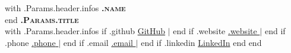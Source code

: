 \documentclass[letterpaper,11pt]{article}
\begin{document}


\begin{center}
  {{ with .Params.header.infos }}
    \textbf{\Huge \scshape {{ .name }} } \\ \vspace{3pt}
  {{ end }}
    \textbf{\scshape {{ .Params.title }} } \\ \vspace{3pt}
    \small
    {{ with .Params.header.infos }}{{ if .github}} 
    \faGithub \hspace{.5pt}
    \href{https://github.com/{{.github}} }{GitHub}
    $|${{ end }}{{ if .website}} 
    \faGlobe \hspace{.5pt} \href{ {{ .website }} }{ {{ .website }} }
    $|${{ end }}{{ if .phone}} 
    \faMobile \hspace{.5pt} \href{tel:{{.phone}} }{ {{.phone}} }
    $|${{ end }}{{ if  .email}} 
    \faAt \hspace{.5pt} \href{mailto:{{ .email }} }{ {{ .email }} }
    $|${{ end }}{{ if .linkedin}} 
    \faLinkedinSquare \hspace{.5pt} \href{https://www.linkedin.com/in/{{ .linkedin }}}{LinkedIn}
    {{ end }}{{ end }}
  \end{center}
  
\end{document}
